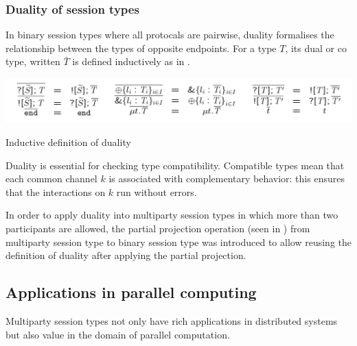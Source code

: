 \subsubsection{Duality of session types}
In binary session types where all protocals are pairwise, duality formalises the relationship between the types of opposite endpoints. For a type $T$, its dual or co type, written $\bar{T}$ is defined inductively as in .
\begin{table}[H]
\includegraphics[width=\textwidth]{background/image/dual-def.png}
\caption{Inductive definition of duality}
\label{b:mpst:dualdef}
\end{table}

Duality is essential for checking type compatibility. Compatible types mean that each common channel $k$ is associated with complementary behavior: this ensures that the interactions on $k$ run without errors. 

In order to apply duality into multiparty session types in which more than two participants are allowed, the partial projection operation (seen in \cite{coppoGentleIntroductionMultiparty2015}) from multiparty session type to binary session type was introduced to allow reusing the definition of duality after applying the partial projection.
\subsection{Applications in parallel computing} \label{b:mpst:app}
Multiparty session types not only have rich applications in distributed systems but also value in the domain of parallel computation. 

